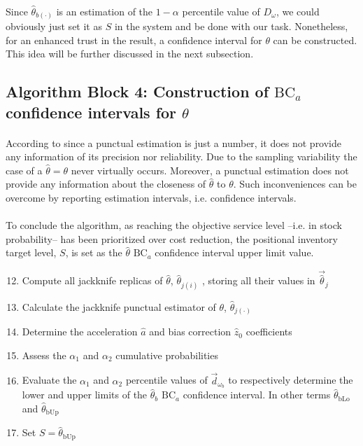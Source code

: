 \documentclass[letterpaper]{article}
\begin{document}
\paragraph{}
Since $\hat{\theta}_{b(\cdot)}$ is an estimation of the $1-\alpha$ percentile value of $D_\omega$, we could obviously just set it as $S$ in the system and be done with our task. Nonetheless, for an enhanced trust in the result, a confidence interval for $\theta$ can be constructed. This idea will be further discussed in the next subsection.

\FloatBarrier

\subsection*{Algorithm Block 4: Construction of $\mathrm{BC}_a$ confidence intervals for $\theta$}
\paragraph{}
According to \cite{devore2015probability} since a punctual estimation is just a number, it does not provide any information of its precision nor reliability. Due to the sampling variability the case of a $\hat{\theta}=\theta$ never virtually occurs. Moreover, a punctual estimation does not provide any information about the closeness of $\hat{\theta}$ to $\theta$. Such inconveniences can be overcome by reporting estimation intervals, i.e. confidence intervals.

\paragraph{}
To conclude the algorithm, as reaching the objective service level --i.e. in stock probability-- has been prioritized over cost reduction, the positional inventory target level, $S$, is set as the $\hat{\theta}$ $\mathrm{BC}_a$ confidence interval upper limit value.

    \begin{enumerate}
        \setcounter{enumi}{11}
        \item Compute all jackknife replicas of $\hat{\theta}$, $\hat{\theta}_{j(i)}$ , storing all their values in $\vec{\hat{\theta}}_j$
        \item Calculate the jackknife punctual estimator of $\theta$, $\hat{\theta}_{j(\cdot)}$
        \item Determine the acceleration $\hat{a}$ and bias correction $\hat{z}_0$ coefficients
        \item Assess the $\alpha_1$ and $\alpha_2$ cumulative probabilities
        \item Evaluate the $\alpha_1$ and $\alpha_2$ percentile values of $\vec{d}_{\omega_b}$ to respectively determine the lower and upper limits of the $\hat{\theta}_b$ $\mathrm{BC}_a$ confidence interval. In other terms $\hat{\theta}_\mathrm{bLo}$ and $\hat{\theta}_\mathrm{bUp}$
        \item Set $S=\hat{\theta}_\mathrm{bUp}$
    \end{enumerate}
\end{document}

